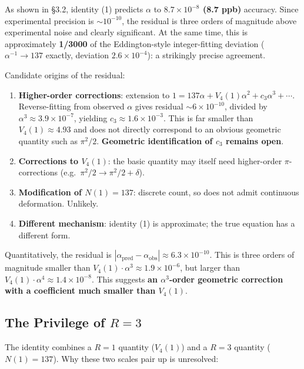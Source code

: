 \documentclass[a4paper,11pt]{article}
\begin{document}
As shown in §3.2, identity (1) predicts $\alpha$ to \textbf{$8.7 \times 10^{-8}$ (8.7 ppb)} accuracy. Since experimental precision is $\sim 10^{-10}$, the residual is three orders of magnitude above experimental noise and clearly significant. At the same time, this is approximately \textbf{1/3000} of the Eddington-style integer-fitting deviation ($\alpha^{-1} \to 137$ exactly, deviation $2.6 \times 10^{-4}$): a strikingly precise agreement.

Candidate origins of the residual:

\begin{enumerate}
\item \textbf{Higher-order corrections}: extension to $1 = 137\alpha + V_4(1)\alpha^2 + c_3 \alpha^3 + \cdots$. Reverse-fitting from observed $\alpha$ gives residual $\sim 6 \times 10^{-10}$, divided by $\alpha^3 \approx 3.9 \times 10^{-7}$, yielding $c_3 \approx 1.6 \times 10^{-3}$. This is far smaller than $V_4(1) \approx 4.93$ and does not directly correspond to an obvious geometric quantity such as $\pi^2/2$. \textbf{Geometric identification of $c_3$ remains open}.

\item \textbf{Corrections to $V_4(1)$}: the basic quantity may itself need higher-order $\pi$-corrections (e.g.\ $\pi^2/2 \to \pi^2/2 + \delta$).

\item \textbf{Modification of $N(1) = 137$}: discrete count, so does not admit continuous deformation. Unlikely.

\item \textbf{Different mechanism}: identity (1) is approximate; the true equation has a different form.
\end{enumerate}

Quantitatively, the residual is $|\alpha_{\text{pred}} - \alpha_{\text{obs}}| \approx 6.3 \times 10^{-10}$. This is three orders of magnitude smaller than $V_4(1) \cdot \alpha^3 \approx 1.9 \times 10^{-6}$, but larger than $V_4(1) \cdot \alpha^4 \approx 1.4 \times 10^{-8}$. This suggests \textbf{an $\alpha^3$-order geometric correction with a coefficient much smaller than $V_4(1)$}.

\subsection{The Privilege of $R = 3$}

The identity combines a $R = 1$ quantity ($V_4(1)$) and a $R = 3$ quantity ($N(1) = 137$). Why these two scales pair up is unresolved:
\end{document}
